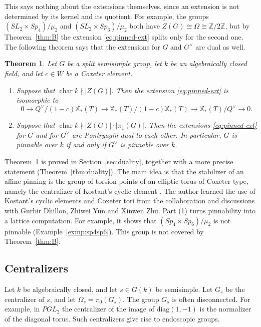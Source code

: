 \documentclass[psamsfonts]{amsart}
\theoremstyle{definition}
\theoremstyle{remark}
\numberwithin{equation}{section}
\newcommand{\Z}{\mathbb{Z}}   %
\newcommand{\X}{\mathbb{X}}
\newcommand{\diag}{\text{diag}}
\newcommand{\ra}{\rightarrow}
\DeclareMathOperator{\chara}{char}
\numberwithin{equation}{section}
\newcommand{\Om}{\Omega}
\theoremstyle{plain}
\newtheorem{introthm}{Theorem}
\begin{document}
This says nothing about the extensions themselves, since an extension is not determined by its kernel and its quotient. For example, the groups $(SL_2\times Sp_4)/\mu_2$ and $(SL_2\times Sp_6)/\mu_2$ both have $Z(G)\cong\Om\cong\Z/2\Z$, but by Theorem~\ref{thm:B} the extension \eqref{eq:pinned-ext} splits only for the second one. The following theorem says that the extensions for $G$ and $G^\vee$ are dual as well.

\begin{introthm}\label{thm:dual}
Let $G$ be a split semisimple group, let $k$ be an algebraically closed field, and let $c\in W$ be a Coxeter element.
\begin{enumerate}[(1)]
\item Suppose that $\chara k\nmid|Z(G)|$. Then the extension \eqref{eq:pinned-ext} is isomorphic to
\[
0\ra Q^\vee/(1-c)\X_*(T)\ra\X_*(T)/(1-c)\X_*(T)\ra\X_*(T)/Q^\vee\ra0.
\]
\item Suppose that $\chara k\nmid|Z(G)|\cdot|\pi_1(G)|$. Then the extensions \eqref{eq:pinned-ext} for $G$ and for $G^\vee$ are Pontryagin dual to each other. In particular, $G$ is pinnable over $k$ if and only if $G^\vee$ is pinnable over $k$.
\end{enumerate}
\end{introthm}

Theorem~\ref{thm:dual} is proved in Section~\ref{sec:duality}, together with a more precise statement (Theorem~\ref{thm:duality}). The main idea is that the stabilizer of an affine pinning is the group of torsion points of an elliptic torus of Coxeter type, namely the centralizer of Kostant's cyclic element \cite{Kos59}. The author learned the use of Kostant's cyclic elements and Coxeter tori from the collaboration \cite{DLYZ} and discussions with Gurbir Dhillon, Zhiwei Yun and Xinwen Zhu. Part (1) turns pinnability into a lattice computation. For example, it shows that $(Sp_4\times Sp_6)/\mu_2$ is not pinnable (Example~\ref{exmp:sp4sp6}). This group is not covered by Theorem~\ref{thm:B}.

\subsection*{Centralizers}
Let $k$ be algebraically closed, and let $s\in G(k)$ be semisimple. Let $G_s$ be the centralizer of $s$, and let $\Om_s=\pi_0(G_s)$. The group $G_s$ is often disconnected. For example, in $PGL_2$ the centralizer of the image of $\diag(1,-1)$ is the normalizer of the diagonal torus. Such centralizers give rise to endoscopic groups.
\end{document}

